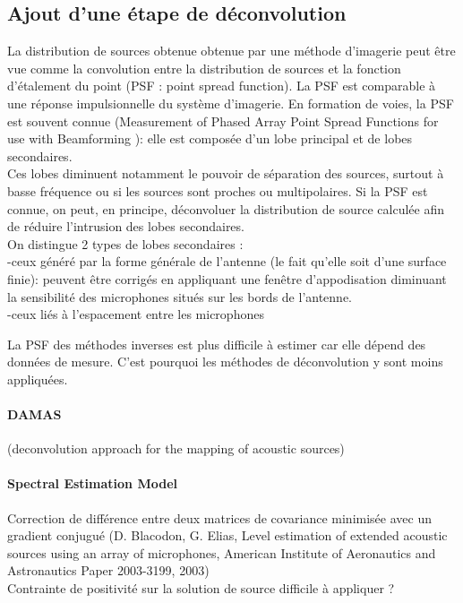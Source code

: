 \subsection{Ajout d'une étape de déconvolution}





La distribution de sources obtenue obtenue par une méthode d'imagerie peut être vue comme la convolution entre la distribution de sources et la fonction d'étalement du point (PSF : point spread function). La PSF est comparable à une réponse impulsionnelle du système d'imagerie. En formation de voies, la PSF est souvent connue (Measurement of Phased Array Point Spread Functions for use with Beamforming ): elle est composée d'un lobe principal et de lobes secondaires. \\




Ces lobes diminuent notamment le pouvoir de séparation des sources, surtout à basse fréquence ou si les sources sont proches ou multipolaires. Si la PSF est connue, on peut, en principe, déconvoluer la distribution  de source calculée afin de réduire l'intrusion des lobes secondaires.\\

On distingue 2 types de lobes secondaires :\\
-ceux généré par la forme générale de l'antenne (le fait qu'elle soit d'une surface finie): peuvent être corrigés en appliquant une fenêtre d'appodisation diminuant la sensibilité des microphones situés sur les bords de l'antenne.\\
-ceux liés à l'espacement entre les microphones


La PSF des méthodes inverses est plus difficile à estimer car elle dépend des données de mesure. C'est pourquoi les méthodes de déconvolution y sont moins appliquées. \\


\paragraph{DAMAS}

 \cite{brooks_2006_damas} (deconvolution approach for the mapping of acoustic sources)
 
\paragraph{Spectral Estimation Model}
Correction de différence entre deux matrices de covariance minimisée avec un gradient conjugué (D. Blacodon, G. Elias, Level estimation of extended acoustic sources using an array of microphones, American Institute of Aeronautics and Astronautics Paper 2003-3199, 2003)\\
Contrainte de positivité sur la solution de source difficile à appliquer ?

